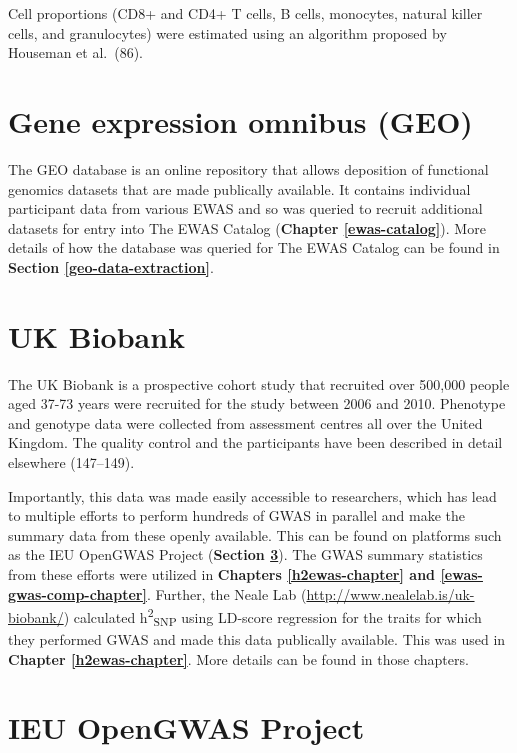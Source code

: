 \documentclass[11pt,twoside]{bristolthesis}
\begin{document}
Cell proportions (CD8+ and CD4+ T cells, B cells, monocytes, natural killer cells, and granulocytes) were estimated using an algorithm proposed by Houseman et al.~(86).

\hypertarget{geo-02}{%
\section{Gene expression omnibus (GEO)}\label{geo-02}}

The GEO database is an online repository that allows deposition of functional genomics datasets that are made publically available. It contains individual participant data from various EWAS and so was queried to recruit additional datasets for entry into The EWAS Catalog (\textbf{Chapter \ref{ewas-catalog}}). More details of how the database was queried for The EWAS Catalog can be found in \textbf{Section \ref{geo-data-extraction}}.

\hypertarget{uk-biobank-02}{%
\section{UK Biobank}\label{uk-biobank-02}}

The UK Biobank is a prospective cohort study that recruited over 500,000 people aged 37-73 years were recruited for the study between 2006 and 2010. Phenotype and genotype data were collected from assessment centres all over the United Kingdom. The quality control and the participants have been described in detail elsewhere (147--149).

Importantly, this data was made easily accessible to researchers, which has lead to multiple efforts to perform hundreds of GWAS in parallel and make the summary data from these openly available. This can be found on platforms such as the IEU OpenGWAS Project (\textbf{Section \ref{ieu-opengwas-project-02}}). The GWAS summary statistics from these efforts were utilized in \textbf{Chapters \ref{h2ewas-chapter} and \ref{ewas-gwas-comp-chapter}}. Further, the Neale Lab (\url{http://www.nealelab.is/uk-biobank/}) calculated h\textsuperscript{2}\textsubscript{SNP} using LD-score regression for the traits for which they performed GWAS and made this data publically available. This was used in \textbf{Chapter \ref{h2ewas-chapter}}. More details can be found in those chapters.

\hypertarget{ieu-opengwas-project-02}{%
\section{IEU OpenGWAS Project}\label{ieu-opengwas-project-02}}
\end{document}
